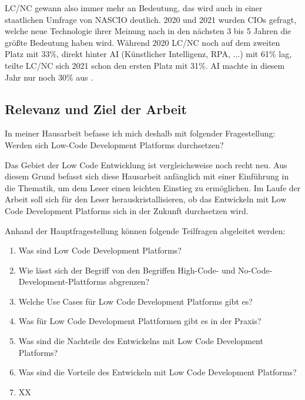 \documentclass[12pt]{article} %
\begin{document}
	LC/NC gewann also immer mehr an Bedeutung, das wird auch in einer staatlichen Umfrage von NASCIO deutlich. 2020 und 2021 wurden CIOs gefragt, welche neue Technologie ihrer Meinung nach in den nächsten 3 bis 5 Jahren die größte Bedeutung haben wird. Während 2020 LC/NC noch auf dem zweiten Platz mit 33\%, direkt hinter AI (Künstlicher Intelligenz, RPA, ...) mit 61\% lag, teilte LC/NC sich 2021 schon den ersten Platz mit 31\%. AI machte in diesem Jahr nur noch 30\% aus \cite{AmyGlasscock.2021}.
	
	\subsection{Relevanz und Ziel der Arbeit}	
	In meiner Hausarbeit befasse ich mich deshalb mit folgender Fragestellung:\newline
			Werden sich Low-Code Development Platforms durchsetzen? \newline
			
	Das Gebiet der Low Code Entwicklung ist vergleichsweise noch recht neu. Aus diesem Grund befasst sich diese Hausarbeit anfänglich mit einer Einführung in die Thematik, um dem Leser einen leichten Einstieg zu ermöglichen. Im Laufe der Arbeit soll sich für den Leser herauskristallisieren, ob das Entwickeln mit Low Code Development Platforms sich in der Zukunft durchsetzen wird. \newline
	
	Anhand der Hauptfragestellung können folgende Teilfragen abgeleitet werden:
	\begin{enumerate}[label=(\roman*)]
		\setlength{\itemsep}{1pt}
		\item Was sind Low Code Development Platforms? 
		\item Wie lässt sich der Begriff von den Begriffen High-Code- und No-Code-Development-Plattforms abgrenzen?
		\item Welche Use Cases für Low Code Development Platforms gibt es? 
		\item Was für Low Code Development Plattformen gibt es in der Praxis?
		\item Was sind die Nachteile des Entwickelns mit Low Code Development Platforms? 
		\item Was sind die Vorteile des Entwickeln mit Low Code Development Platforms? 
		\item XX %
	\end{enumerate}
\end{document}
